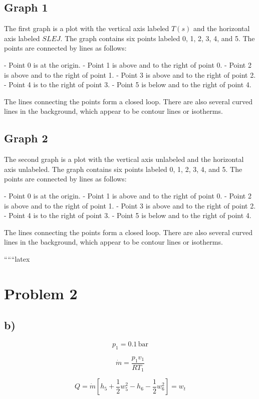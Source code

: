 \subsection*{Graph 1}

The first graph is a plot with the vertical axis labeled \( T(s) \) and the horizontal axis labeled \( SLEJ \). The graph contains six points labeled 0, 1, 2, 3, 4, and 5. The points are connected by lines as follows:

- Point 0 is at the origin.
- Point 1 is above and to the right of point 0.
- Point 2 is above and to the right of point 1.
- Point 3 is above and to the right of point 2.
- Point 4 is to the right of point 3.
- Point 5 is below and to the right of point 4.

The lines connecting the points form a closed loop. There are also several curved lines in the background, which appear to be contour lines or isotherms.

\subsection*{Graph 2}

The second graph is a plot with the vertical axis unlabeled and the horizontal axis unlabeled. The graph contains six points labeled 0, 1, 2, 3, 4, and 5. The points are connected by lines as follows:

- Point 0 is at the origin.
- Point 1 is above and to the right of point 0.
- Point 2 is above and to the right of point 1.
- Point 3 is above and to the right of point 2.
- Point 4 is to the right of point 3.
- Point 5 is below and to the right of point 4.

The lines connecting the points form a closed loop. There are also several curved lines in the background, which appear to be contour lines or isotherms.

``````latex


\section*{Problem 2}

\subsection*{b)}

\[
p_1 = 0.1 \, \text{bar}
\]

\[
\dot{m} = \frac{p_1 v_1}{R T_1}
\]

\[
Q = \dot{m} \left[ h_5 + \frac{1}{2} w_5^2 - h_6 - \frac{1}{2} w_6^2 \right] = w_t
\]

